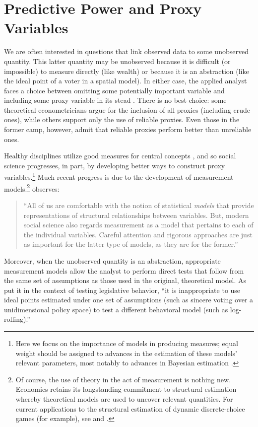 \section{Predictive Power and Proxy Variables}

We are often interested in questions that link observed data to some unobserved quantity.
This latter quantity may be unobserved because it is difficult (or impossible) to measure directly (like wealth) or because it is an abstraction (like the ideal point of a voter in a spatial model).
In either case, the applied analyst faces a choice between omitting some potentially important variable and including some proxy variable in its stead \citep{stahlecker1993}.
There is no best choice: some theoretical econometricians \citep[e.g.][]{mccallum1972} argue for the inclusion of all proxies (including crude ones), while others \citep[e.g.][]{maddala1977} support only the use of reliable proxies.
Even those in the former camp, however, admit that reliable proxies perform better than unreliable ones.

Healthy disciplines utilize good measures for central concepts \citep{kuhn1977}, and so social science progresses, in part, by developing better ways to construct proxy variables.\footnote{Here we focus on the importance of models in producing measures; equal weight should be assigned to advances in the estimation of these models' relevant parameters, most notably to advances in Bayesian estimation \citep{jackman2001,martin2002,clinton2004,bafumi2005}.}
Much recent progress is due to the development of measurement models.\footnote{Of course, the use of theory in the act of measurement is nothing new.
  Economics retains its longstanding commitment to structural estimation whereby theoretical models are used to uncover relevant quantities.
  For current applications to the structural estimation of dynamic discrete-choice games (for example), see \citet{su2012} and \citet{egesdal2013}.} \citet[2]{jacoby2014} observes:
\begin{quote}
  ``All of us are comfortable with the notion of statistical \emph{models} that provide representations of structural relationships between variables.  But, modern social science also regards measurement as a model that pertains to each of the individual variables.  Careful attention and rigorous approaches are just as important for the latter type of models, as they are for the former.''
\end{quote}
Moreover, when the unobserved quantity is an abstraction, appropriate measurement models allow the analyst to perform direct tests that follow from the same set of assumptions as those used in the original, theoretical model.
As \citet[355]{clinton2004} put it in the context of testing legislative behavior, ``it is inappropriate to use ideal points estimated under one set of assumptions (such as sincere voting over a unidimensional policy space) to test a different behavioral model (such as log-rolling).''

